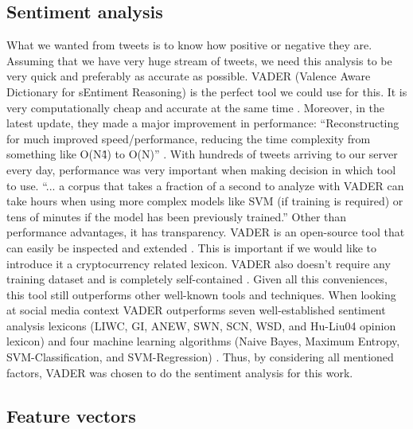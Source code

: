 \documentclass[a4paper,11pt,oneside]{article}
\begin{document}
  \subsection{Sentiment analysis}
  
  What we wanted from tweets is to know how positive or negative they are. Assuming that we have very huge stream of tweets, we need this analysis to be very quick and preferably as accurate as possible. VADER (Valence Aware Dictionary for sEntiment Reasoning) \cite{vader} is the perfect tool we could use for this. It is very computationally cheap and accurate at the same time \cite{vader}. Moreover, in the latest update, they made a major improvement in performance: “Reconstructing for much improved speed/performance, reducing the time complexity from something like O(N\^4) to O(N)” \cite{vadergit}. With hundreds of tweets arriving to our server every day, performance was very important when making decision in which tool to use. “... a corpus that takes a fraction of a second to analyze with VADER can take hours when using more complex models like SVM (if training is required) or tens of minutes if the model has been previously trained.” \cite{vader} Other than performance advantages, it has transparency. VADER is an open-source tool that can easily be inspected and extended \cite{vader} \cite{vadergit}. This is important if we would like to introduce it a cryptocurrency related lexicon. VADER also doesn’t require any training dataset and is completely self-contained \cite{vader}. Given all this conveniences, this tool still outperforms other well-known tools and techniques. When looking at social media context VADER outperforms seven well-established sentiment analysis lexicons (LIWC, GI, ANEW, SWN, SCN, WSD, and Hu-Liu04 opinion lexicon) and four machine learning algorithms (Naive Bayes, Maximum Entropy, SVM-Classification, and SVM-Regression) \cite{vader}. Thus, by considering all mentioned factors, VADER was chosen to do the sentiment analysis for this work.
  
  
  \subsection{Feature vectors}
  
\end{document}

